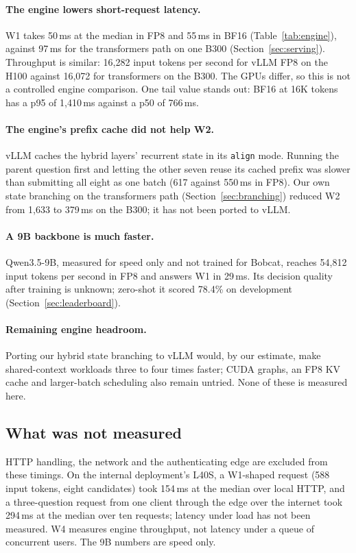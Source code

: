 \paragraph{The engine lowers short-request latency.}
W1 takes 50\,ms at the median in FP8 and 55\,ms in BF16 (Table~\ref{tab:engine}), against
97\,ms for the transformers path on one B300 (Section~\ref{sec:serving}). Throughput is
similar: 16,282 input tokens per second for vLLM FP8 on the H100 against 16,072 for
transformers on the B300. The GPUs differ, so this is not a controlled engine comparison.
One tail value stands out: BF16 at 16K tokens has a p95 of 1,410\,ms against a p50 of 766\,ms.

\paragraph{The engine's prefix cache did not help W2.}
vLLM caches the hybrid layers' recurrent state in its \texttt{align} mode. Running the parent
question first and letting the other seven reuse its cached prefix was slower than submitting
all eight as one batch (617 against 550\,ms in FP8). Our own state branching on the
transformers path (Section~\ref{sec:branching}) reduced W2 from 1,633 to 379\,ms on the B300;
it has not been ported to vLLM.

\paragraph{A 9B backbone is much faster.}
Qwen3.5-9B, measured for speed only and not trained for Bobcat, reaches 54,812 input tokens
per second in FP8 and answers W1 in 29\,ms. Its decision quality after training is unknown;
zero-shot it scored 78.4\% on development (Section~\ref{sec:leaderboard}).

\paragraph{Remaining engine headroom.}
Porting our hybrid state branching to vLLM would, by our estimate, make shared-context
workloads three to four times faster; CUDA graphs, an FP8 KV cache and larger-batch
scheduling also remain untried. None of these is measured here.

\subsection{What was not measured}

HTTP handling, the network and the authenticating edge are excluded from these timings. On the
internal deployment's L40S, a W1-shaped request (588 input tokens, eight candidates) took
154\,ms at the median over local HTTP, and a three-question request from one client through
the edge over the internet took 294\,ms at the median over ten requests; latency under load
has not been measured. W4 measures engine throughput, not latency under a queue of
concurrent users. The 9B numbers are speed only.
